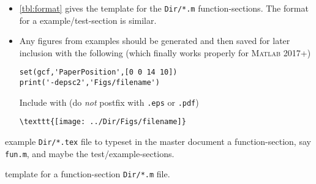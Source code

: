 \begin{itemize}
\item \autoref{tbl:format} gives the template for the \verb|Dir/*.m| function-sections.
The format for a example\slash test-section is similar.


\item Any figures from examples should be generated and then saved for later inclusion with the following (which finally works properly for \textsc{Matlab} 2017+)
\begin{verbatim}
set(gcf,'PaperPosition',[0 0 14 10])
print('-depsc2','Figs/filename')
\end{verbatim}
Include with (do \emph{not} postfix with \verb|.eps| or \verb|.pdf|)
\begin{verbatim}
\texttt{[image: ../Dir/Figs/filename]}
\end{verbatim}

\end{itemize}


\begin{table}
\caption{\label{tbl:funtex}example \texttt{Dir/*.tex} file to typeset in the master document a function-section, say \texttt{fun.m}, and maybe the test\slash example-sections.}
\end{table}
\begin{table}
\caption{\label{tbl:format}template for a function-section \texttt{Dir/*.m} file.}
\end{table}


